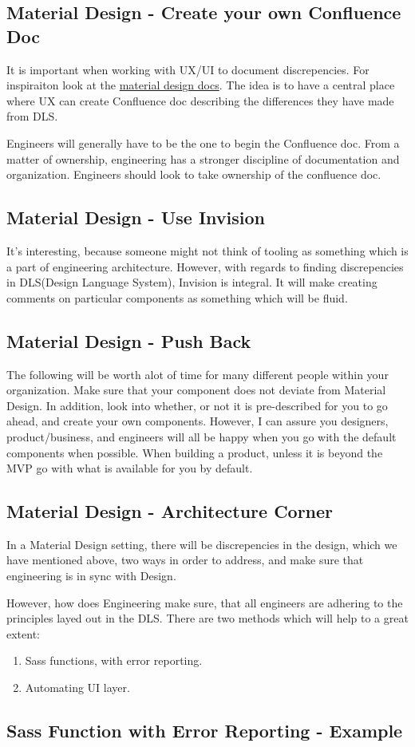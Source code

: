 \subsection{ Material Design - Create your own Confluence Doc }

It is important when working with UX/UI to document discrepencies. For
inspiraiton look at the \href{https://material.io/guidelines/components/sliders.html}{material design docs}.
The idea is to have a central place where UX can create Confluence doc
describing the differences they have made from DLS.

Engineers will generally have to be the one to begin the Confluence doc. From a
matter of ownership, engineering has a stronger discipline of documentation and
organization. Engineers should look to take ownership of the confluence doc.

\subsection{ Material Design - Use Invision }
It's interesting, because someone might not think of tooling as something which
is a part of engineering architecture. However, with regards to finding
discrepencies in DLS(Design Language System), Invision is integral. It will
make creating comments on particular components as something which will be fluid.

\subsection{ Material Design - Push Back }
The following will be worth alot of time for many different people within your
organization. Make sure that your component does not deviate from Material
Design. In addition, look into whether, or not it is pre-described for you to
go ahead, and create your own components. However, I can assure you designers,
product/business, and engineers will all be happy when you go with the default
components when possible. When building a product, unless it is beyond the MVP
go with what is available for you by default.

\subsection{ Material Design - Architecture Corner }
In a Material Design setting, there will be discrepencies in the design, which
we have mentioned above, two ways in order to address, and make sure that
engineering is in sync with Design.

However, how does Engineering make sure, that all engineers are adhering to the
principles layed out in the DLS. There are two methods which will help to a
great extent:
\begin{enumerate}
  \item Sass functions, with error reporting.
  \item Automating UI layer.
\end{enumerate}

\subsection{ Sass Function with Error Reporting - Example }
